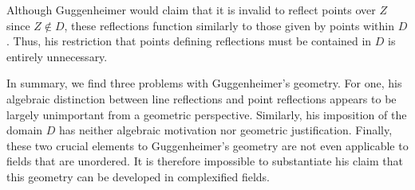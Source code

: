 \documentclass[12pt]{article}
\theoremstyle{plain}
\theoremstyle{definition}
\begin{document}
Although Guggenheimer would claim that it is invalid to reflect points over $Z$ since $Z \notin D$, these reflections function similarly to those given by points within $D$. Thus, his restriction that points defining reflections must be contained in $D$ is entirely unnecessary. 

In summary, we find three problems with Guggenheimer's geometry. For one, his algebraic distinction between line reflections and point reflections appears to be largely unimportant from a geometric perspective. Similarly, his imposition of the domain $D$ has neither algebraic motivation nor geometric justification. Finally, these two crucial elements to Guggenheimer's geometry are not even applicable to fields that are unordered. It is therefore impossible to substantiate his claim that this geometry can be developed in complexified fields.
\end{document}
